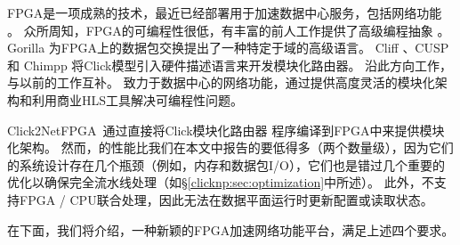FPGA是一项成熟的技术，最近已经部署用于加速数据中心服务，包括网络功能 \cite {putnam2014reconfigurable,smartnic,rubow2010chimpp,lavasani2012compiling}。
众所周知，FPGA的可编程性很低，有丰富的前人工作提供了高级编程抽象 \cite {bluespec,auerbach2010lime,bacon2013fpga,singh2011implementing,bachrach2012chisel,wester2015transformation}。
Gorilla \cite {lavasani2012compiling} 为FPGA上的数据包交换提出了一种特定于域的高级语言。
Cliff \cite{kulkarni2004mapping}、CUSP \cite{schelle2005cusp} 和 Chimpp \cite {rubow2010chimpp} 将Click模型引入硬件描述语言来开发模块化路由器。
\name 沿此方向工作，与以前的工作互补。
\name 致力于数据中心的网络功能，通过提供高度灵活的模块化架构和利用商业HLS工具解决可编程性问题。

Click2NetFPGA~\cite {Click2NetFPGA}通过直接将Click模块化路由器 \cite {kohler2000click}程序编译到FPGA中来提供模块化架构。
然而，\cite {Click2NetFPGA}的性能比我们在本文中报告的要低得多（两个数量级），因为它们的系统设计存在几个瓶颈（例如，内存和数据包I/O），它们也是错过几个重要的优化以确保完全流水线处理（如\S \ref {clicknp:sec:optimization}中所述）。
此外，\cite {Click2NetFPGA}不支持FPGA / CPU联合处理，因此无法在数据平面运行时更新配置或读取状态。



在下面，我们将介绍\name{}，一种新颖的FPGA加速网络功能平台，满足上述四个要求。

